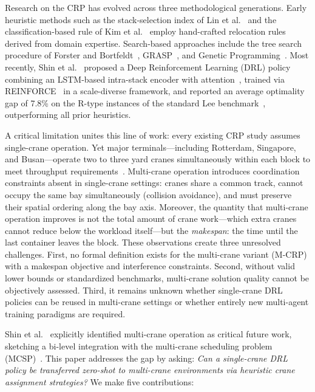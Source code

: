 \documentclass[11pt,a4paper]{elsarticle}
\begin{document}
Research on the CRP has evolved across three methodological generations. Early heuristic methods such as the stack-selection index of Lin et al.~\cite{lin2015} and the classification-based rule of Kim et al.~\cite{kim2016} employ hand-crafted relocation rules derived from domain expertise. Search-based approaches include the tree search procedure of Forster and Bortfeldt~\cite{forster2012}, GRASP~\cite{cifuentes2020}, and Genetic Programming~\cite{durasevic2025}. Most recently, Shin et al.~\cite{shin2026} proposed a Deep Reinforcement Learning (DRL) policy combining an LSTM-based intra-stack encoder with attention~\cite{vaswani2017}, trained via REINFORCE~\cite{williams1992} in a scale-diverse framework, and reported an average optimality gap of 7.8\% on the R-type instances of the standard Lee benchmark~\cite{lee2010}, outperforming all prior heuristics.

A critical limitation unites this line of work: every existing CRP study assumes single-crane operation. Yet major terminals---including Rotterdam, Singapore, and Busan---operate two to three yard cranes simultaneously within each block to meet throughput requirements~\cite{stahlbock2008}. Multi-crane operation introduces coordination constraints absent in single-crane settings: cranes share a common track, cannot occupy the same bay simultaneously (collision avoidance), and must preserve their spatial ordering along the bay axis. Moreover, the quantity that multi-crane operation improves is not the total amount of crane work---which extra cranes cannot reduce below the workload itself---but the \emph{makespan}: the time until the last container leaves the block. These observations create three unresolved challenges. First, no formal definition exists for the multi-crane variant (M-CRP) with a makespan objective and interference constraints. Second, without valid lower bounds or standardized benchmarks, multi-crane solution quality cannot be objectively assessed. Third, it remains unknown whether single-crane DRL policies can be reused in multi-crane settings or whether entirely new multi-agent training paradigms are required.

Shin et al.~\cite{shin2026} explicitly identified multi-crane operation as critical future work, sketching a bi-level integration with the multi-crane scheduling problem (MCSP)~\cite{shinkim2025}. This paper addresses the gap by asking: \emph{Can a single-crane DRL policy be transferred zero-shot to multi-crane environments via heuristic crane assignment strategies?} We make five contributions:
\end{document}
